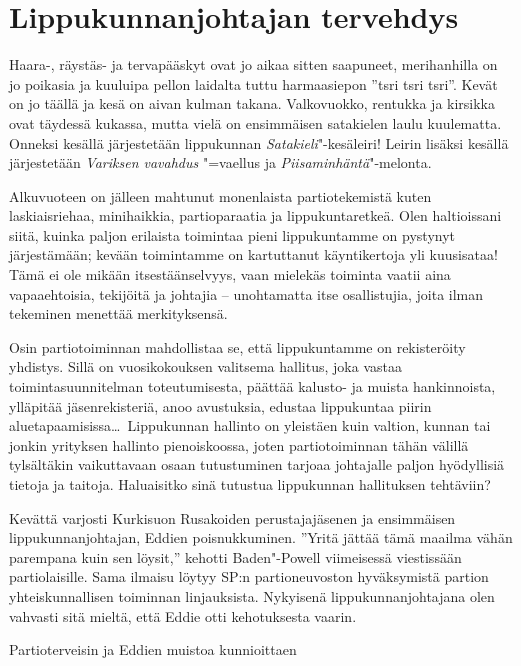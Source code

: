 \section{Lippukunnanjohtajan tervehdys}

\begin{multicols}{2}
\noindent Haara-, räystäs- ja tervapääskyt ovat jo aikaa sitten saapuneet, 
merihanhilla on jo poikasia ja kuuluipa pellon laidalta tuttu harmaasiepon 
''tsri tsri tsri''. Kevät on jo täällä ja kesä on aivan kulman takana. 
Valkovuokko, rentukka ja kirsikka ovat täydessä kukassa, mutta vielä on 
ensimmäisen satakielen laulu kuulematta. Onneksi kesällä järjestetään 
lippukunnan \textit{Satakieli}"-kesäleiri! Leirin lisäksi kesällä 
järjestetään \textit{Variksen vavahdus} "=vaellus ja 
\textit{Piisaminhäntä}"-melonta.

Alkuvuoteen on jälleen mahtunut monenlaista partiotekemistä kuten 
laskiaisriehaa, minihaikkia, partioparaatia ja lippukuntaretkeä. Olen 
haltioissani siitä, kuinka paljon erilaista toimintaa pieni lippukuntamme on 
pystynyt järjestämään; kevään toimintamme on kartuttanut käyntikertoja 
yli kuusisataa! Tämä ei ole mikään itsestäänselvyys, vaan mielekäs 
toiminta vaatii aina vapaaehtoisia, tekijöitä ja johtajia -- unohtamatta itse 
osallistujia, joita ilman tekeminen menettää merkityksensä.  

Osin partiotoiminnan mahdollistaa se, että lippukuntamme on rekisteröity 
yhdistys. Sillä on vuosikokouksen valitsema hallitus, joka vastaa 
toimintasuunnitelman toteutumisesta, päättää kalusto- ja muista 
hankinnoista, ylläpitää jäsenrekisteriä, anoo avustuksia, edustaa 
lippukuntaa piirin aluetapaamisissa\ldots\ Lippukunnan hallinto on yleistäen 
kuin valtion, kunnan tai jonkin yrityksen hallinto pienoiskoossa, joten 
partiotoiminnan tähän välillä tylsältäkin vaikuttavaan osaan tutustuminen 
tarjoaa johtajalle paljon hyödyllisiä tietoja ja taitoja. Haluaisitko sinä 
tutustua lippukunnan hallituksen tehtäviin? 

Kevättä varjosti Kurkisuon Rusakoiden perustajajäsenen ja ensimmäisen 
lippukunnanjohtajan, Eddien poisnukkuminen. ''Yritä jättää tämä maailma 
vähän parempana kuin sen löysit,'' kehotti Baden"-Powell viimeisessä 
viestissään partiolaisille. Sama ilmaisu löytyy SP:n partioneuvoston 
hyväksymistä partion yhteiskunnallisen toiminnan linjauksista. Nykyisenä 
lippukunnanjohtajana olen vahvasti sitä mieltä, että Eddie otti kehotuksesta 
vaarin.

Partioterveisin ja Eddien muistoa kunnioittaen


\end{multicols}
